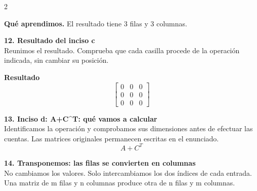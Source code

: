 \documentclass[11pt,a4paper,landscape]{article}
\begin{document}
\begin{multicols*}{2}
\begin{minipage}{\linewidth}
\par\smallskip\textbf{Qué aprendimos.} El resultado tiene 3 filas y 3 columnas.
\end{minipage}\par\medskip
\noindent\begin{minipage}{\linewidth}\textbf{12. Resultado del inciso c}\\[2pt]Reunimos el resultado. Comprueba que cada casilla procede de la operación indicada, sin cambiar su posición.
\par\smallskip \textbf{Resultado}\[\begin{bmatrix}0 & 0 & 0\\0 & 0 & 0\\0 & 0 & 0\end{bmatrix}\]
\end{minipage}\par\medskip
\noindent\begin{minipage}{\linewidth}\textbf{13. Inciso d: A+C\textasciicircum{}T: qué vamos a calcular}\\[2pt]Identificamos la operación y comprobamos sus dimensiones antes de efectuar las cuentas. Las matrices originales permanecen escritas en el enunciado.
\[A+C^T\]
\end{minipage}\par\medskip
\noindent\begin{minipage}{\linewidth}\textbf{14. Transponemos: las filas se convierten en columnas}\\[2pt]No cambiamos los valores. Solo intercambiamos los dos índices de cada entrada. Una matriz de m filas y n columnas produce otra de n filas y m columnas.
\par{}\par\smallskip

\end{minipage}
\end{multicols*}
\end{document}
